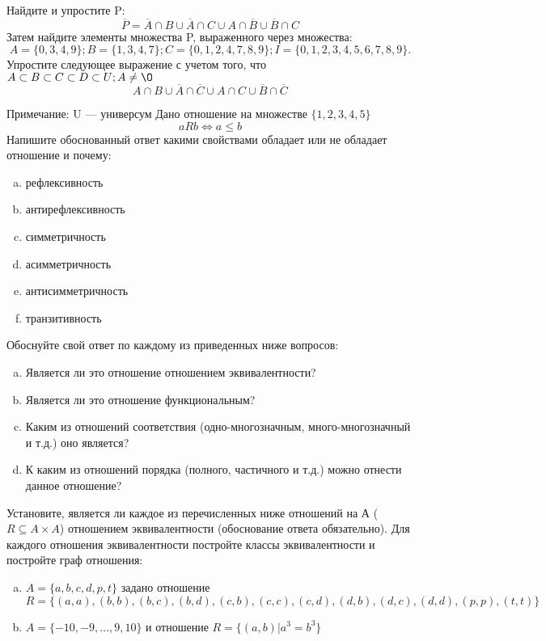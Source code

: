 \documentclass[10pt]{exam}
\begin{document}
\begin{questions}
\question
Найдите и упростите P:
\begin{equation*}
\overline{P} = \overline{A} \cap B \cup \overline{A} \cap C \cup A \cap \overline{B} \cup \overline{B} \cap C
\end{equation*}
Затем найдите элементы множества P, выраженного через множества:
\begin{equation*}
A = \{0, 3, 4, 9\}; 
B = \{1, 3, 4, 7\};
C = \{0, 1, 2, 4, 7, 8, 9\};
I = \{0, 1, 2, 3, 4, 5, 6, 7, 8, 9\}.
\end{equation*}\question
Упростите следующее выражение с учетом того, что $A\subset B \subset C \subset D \subset U; A \neq \O$
\begin{equation*}
A \cap B \cup \overline{A} \cap \overline{C} \cup A \cap C \cup \overline{B} \cap \overline{C}
\end{equation*}

Примечание: U — универсум\question
Дано отношение на множестве $\{1, 2, 3, 4, 5\}$ 
\begin{equation*}
aRb \iff a \leq b
\end{equation*}
Напишите обоснованный ответ какими свойствами обладает или не обладает отношение и почему:   
\begin{enumerate} [a)]\setcounter{enumi}{0}
\item рефлексивность
\item антирефлексивность
\item симметричность
\item асимметричность
\item антисимметричность
\item транзитивность
\end{enumerate}

Обоснуйте свой ответ по каждому из приведенных ниже вопросов:
\begin{enumerate} [a)]\setcounter{enumi}{0}
    \item Является ли это отношение отношением эквивалентности?
    \item Является ли это отношение функциональным?
    \item Каким из отношений соответствия (одно-многозначным, много-многозначный и т.д.) оно является?
    \item К каким из отношений порядка (полного, частичного и т.д.) можно отнести данное отношение?
\end{enumerate}


\question
Установите, является ли каждое из перечисленных ниже отношений на А ($R \subseteq A \times A$) отношением эквивалентности (обоснование ответа обязательно). Для каждого отношения эквивалентности постройте классы 
эквивалентности и постройте граф отношения:
\begin{enumerate} [a)]\setcounter{enumi}{0}
\item $A = \{a, b, c, d, p, t\}$ задано отношение $R = \{(a, a), (b, b), (b, c), (b, d), (c, b), (c, c), (c, d), (d, b), (d, c), (d, d), (p,p), (t,t)\}$
\item $A = \{-10, -9, … , 9, 10\}$ и отношение $R = \{(a,b)|a^{3} = b^{3}\}$


\end{enumerate}
\end{questions}
\end{document}
